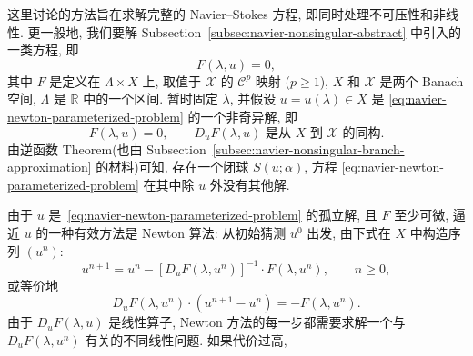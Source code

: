 这里讨论的方法旨在求解完整的 Navier--Stokes 方程, 即同时处理不可压性和非线性.
更一般地, 我们要解 Subsection~\ref{subsec:navier-nonsingular-abstract} 中引入的一类方程,
即
\begin{equation}
\label{eq:navier-newton-parameterized-problem}
F(\lambda,u)=0,
\end{equation}
其中 $F$ 是定义在 $\Lambda\times X$ 上, 取值于 $\mathscr X$ 的 $\mathcal C^p$ 映射
($p\geq1$), $X$ 和 $\mathscr X$ 是两个 Banach 空间, $\Lambda$ 是 $\mathbb R$
中的一个区间. 暂时固定 $\lambda$, 并假设 $u=u(\lambda)\in X$ 是
\eqref{eq:navier-newton-parameterized-problem} 的一个非奇异解, 即
\[
F(\lambda,u)=0,
\qquad D_uF(\lambda,u)\text{ 是从 }X\text{ 到 }\mathscr X\text{ 的同构}.
\]
由逆函数 Theorem(也由 Subsection~\ref{subsec:navier-nonsingular-branch-approximation}
的材料)可知, 存在一个闭球 $S(u;\alpha)$, 方程
\eqref{eq:navier-newton-parameterized-problem} 在其中除 $u$ 外没有其他解.

由于 $u$ 是 \,\eqref{eq:navier-newton-parameterized-problem} 的孤立解, 且 $F$
至少可微, 逼近 $u$ 的一种有效方法是 Newton 算法: 从初始猜测 $u^0$ 出发,
由下式在 $X$ 中构造序列 $(u^n)$:
\begin{equation}
\label{eq:navier-newton-iteration}
u^{n+1}=u^n-[D_uF(\lambda,u^n)]^{-1}\mathbin{\cdot}F(\lambda,u^n),
\qquad n\geq0,
\end{equation}
或等价地
\[
D_uF(\lambda,u^n)\mathbin{\cdot}(u^{n+1}-u^n)=-F(\lambda,u^n).
\]
由于 $D_uF(\lambda,u)$ 是线性算子, Newton 方法的每一步都需要求解一个与
$D_uF(\lambda,u^n)$ 有关的不同线性问题. 如果代价过高,
